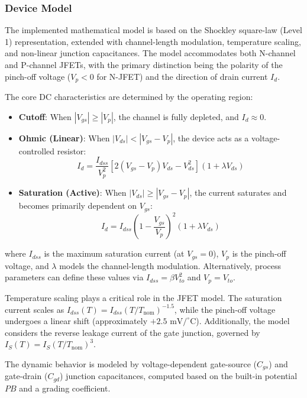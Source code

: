 \subsubsection{Device Model}
The implemented mathematical model is based on the Shockley square-law (Level 1) representation, extended with channel-length modulation, temperature scaling, and non-linear junction capacitances. The model accommodates both N-channel and P-channel JFETs, with the primary distinction being the polarity of the pinch-off voltage ($V_p < 0$ for N-JFET) and the direction of drain current $I_d$. 

The core DC characteristics are determined by the operating region:
\begin{itemize}
    \item \textbf{Cutoff}: When $|V_{gs}| \ge |V_p|$, the channel is fully depleted, and $I_d \approx 0$.
    \item \textbf{Ohmic (Linear)}: When $|V_{ds}| < |V_{gs} - V_p|$, the device acts as a voltage-controlled resistor:
    \begin{equation}
        I_d = \frac{I_{dss}}{V_p^2} \left[ 2(V_{gs}-V_p)V_{ds} - V_{ds}^2 \right] (1 + \lambda V_{ds})
    \end{equation}
    \item \textbf{Saturation (Active)}: When $|V_{ds}| \ge |V_{gs} - V_p|$, the current saturates and becomes primarily dependent on $V_{gs}$:
    \begin{equation}
        I_d = I_{dss} \left( 1 - \frac{V_{gs}}{V_p} \right)^2 (1 + \lambda V_{ds})
    \end{equation}
\end{itemize}
where $I_{dss}$ is the maximum saturation current (at $V_{gs}=0$), $V_p$ is the pinch-off voltage, and $\lambda$ models the channel-length modulation. Alternatively, process parameters can define these values via $I_{dss} = \beta V_{to}^2$ and $V_p = V_{to}$.

Temperature scaling plays a critical role in the JFET model. The saturation current scales as $I_{dss}(T) = I_{dss} (T/T_{\text{nom}})^{-1.5}$, while the pinch-off voltage undergoes a linear shift (approximately $+2.5 \text{ mV}/^\circ\text{C}$). Additionally, the model considers the reverse leakage current of the gate junction, governed by $I_S(T) = I_S (T/T_{\text{nom}})^3$.

The dynamic behavior is modeled by voltage-dependent gate-source ($C_{gs}$) and gate-drain ($C_{gd}$) junction capacitances, computed based on the built-in potential $PB$ and a grading coefficient.

